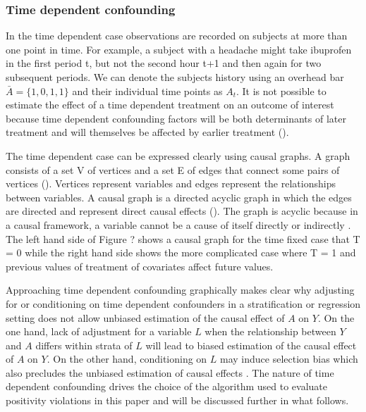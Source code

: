 \documentclass[11pt]{article}
\begin{document}
    \subsubsection{Time dependent
confounding}\label{time-dependent-confounding}

In the time dependent case observations are recorded on subjects at more
than one point in time. For example, a subject with a headache might
take ibuprofen in the first period t, but not the second hour t+1 and
then again for two subsequent periods. We can denote the subjects
history using an overhead bar \(\bar A = \{1, 0, 1, 1\}\) and their
individual time points as \(A_t\). It is not possible to estimate the
effect of a time dependent treatment on an outcome of interest because
time dependent confounding factors will be both determinants of later
treatment and will themselves be affected by earlier treatment
(\citet{Robins2000a}).

The time dependent case can be expressed clearly using causal graphs. A
graph consists of a set V of vertices and a set E of edges that connect
some pairs of vertices (\citet{Pearl2009}). Vertices represent variables
and edges represent the relationships between variables. A causal graph
is a directed acyclic graph in which the edges are directed and
represent direct causal effects (\citet{Robins2000}). The graph is
acyclic because in a causal framework, a variable cannot be a cause of
itself directly or indirectly \citet{Hernan2004}. The left hand side of
Figure ? shows a causal graph for the time fixed case that T = 0 while
the right hand side shows the more complicated case where T = 1 and
previous values of treatment of covariates affect future values.

Approaching time dependent confounding graphically makes clear why
adjusting for or conditioning on time dependent confounders in a
stratification or regression setting does not allow unbiased estimation
of the causal effect of \(A\) on \(Y\). On the one hand, lack of
adjustment for a variable \(L\) when the relationship between \(Y\) and
\(A\) differs within strata of \(L\) will lead to biased estimation of
the causal effect of \(A\) on \(Y\). On the other hand, conditioning on
\(L\) may induce selection bias which also precludes the unbiased
estimation of causal effects \citet{Hernan2004}. The nature of time
dependent confounding drives the choice of the \citet{Havercroft2012}
algorithm used to evaluate positivity violations in this paper and will
be discussed further in what follows.
\end{document}
